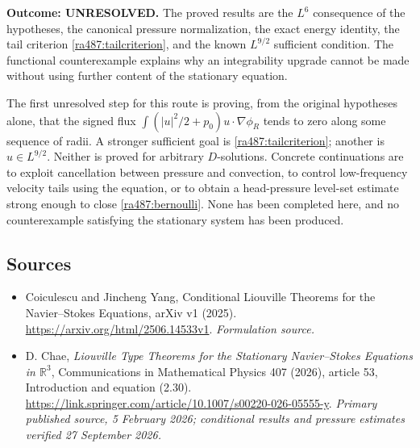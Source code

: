 \documentclass[11pt]{article}
\begin{document}
\textbf{Outcome: UNRESOLVED.} The proved results are the $L^6$ consequence
of the hypotheses, the canonical pressure normalization, the exact energy
identity, the tail criterion \eqref{ra487:tailcriterion}, and the known
$L^{9/2}$ sufficient condition. The functional counterexample explains
why an integrability upgrade cannot be made without using further content
of the stationary equation.

The first unresolved step for this route is proving, from the original
hypotheses alone, that the signed flux
$\int (|u|^2/2+p_0)u\cdot\nabla\phi_R$ tends to zero along some
sequence of radii. A stronger sufficient goal is
\eqref{ra487:tailcriterion}; another is $u\in L^{9/2}$. Neither is
proved for arbitrary $D$-solutions. Concrete continuations are to exploit
cancellation between pressure and convection, to control low-frequency
velocity tails using the equation, or to obtain a head-pressure level-set
estimate strong enough to close \eqref{ra487:bernoulli}. None has been
completed here, and no counterexample satisfying the stationary system
has been produced.

\subsection{Sources}
\begin{itemize}
\item[S1]Coiculescu and Jincheng Yang, Conditional Liouville Theorems for the Navier–Stokes Equations, arXiv v1 (2025).
\url{https://arxiv.org/html/2506.14533v1}.
\textit{Formulation source.}
\item[E1] D. Chae, \emph{Liouville Type Theorems for the Stationary
Navier--Stokes Equations in $\mathbb R^3$}, Communications in Mathematical
Physics 407 (2026), article 53, Introduction and equation (2.30).
\url{https://link.springer.com/article/10.1007/s00220-026-05555-y}.
\textit{Primary published source, 5 February 2026; conditional results and
pressure estimates verified 27 September 2026.}
\end{itemize}
\end{document}
